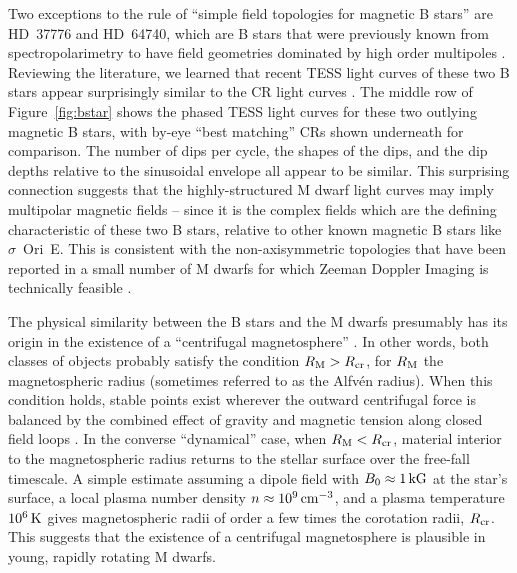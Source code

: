 \documentclass[11pt,twocolumn,tighten]{aastex63}
\begin{document}
Two exceptions to the rule of ``simple field topologies for magnetic B
stars'' are HD~37776 and HD~64740, which are B stars that were
previously known from spectropolarimetry to have field geometries
dominated by high order multipoles \citep{2011ApJ...726...24K}.
Reviewing the literature, we learned that recent TESS light curves of
these two B stars appear surprisingly similar to the CR light curves
\citep{2020pase.conf...46M}.  The middle row of Figure~\ref{fig:bstar}
shows the phased TESS light curves for these two outlying magnetic B
stars, with by-eye ``best matching'' CRs shown underneath for comparison.  The
number of dips per cycle, the shapes of the dips, and the dip depths
relative to the sinusoidal envelope all appear to be similar.  This surprising connection 
suggests that the
highly-structured M dwarf light curves may imply multipolar magnetic
fields -- since it is the complex fields which are the defining
characteristic of these two B stars, relative to other known magnetic
B stars like $\sigma$~Ori~E.  This is consistent with the
non-axisymmetric topologies that have been reported in a small number
of M dwarfs for which Zeeman Doppler Imaging is technically feasible
\citep[see][and references therein]{2021A&ARv..29....1K}.

The physical similarity between the B stars and the M dwarfs
presumably has its origin in the existence of a ``centrifugal
magnetosphere'' \citep[see][]{2013MNRAS.429..398P}.  In other words,
both classes of objects probably satisfy the condition $R_{\rm M} >
R_{\rm cr}$, for $R_{\rm M}$ the magnetospheric radius (sometimes
referred to as the Alfv\'en radius).  When this condition
holds, stable points exist wherever the outward centrifugal force is
balanced by the combined effect of gravity and magnetic tension along
closed field loops \citep{1985Ap&SS.116..285N}.  In the converse
``dynamical'' case, when  $R_{\rm M} < R_{\rm cr}$, material
interior to the magnetospheric radius returns to the stellar surface
over the free-fall timescale.  A simple estimate assuming a dipole
field with $B_0\approx1\,{\rm kG}$ at the star's surface, a local
plasma number density $n\approx10^9\,{\rm cm^{-3}}$, and a plasma
temperature $10^6\,{\rm K}$ gives magnetospheric radii of order a few
times the corotation radii, $R_{\rm cr}$.  This suggests that the
existence of a centrifugal magnetosphere is plausible in young,
rapidly rotating M dwarfs.


\end{document}
